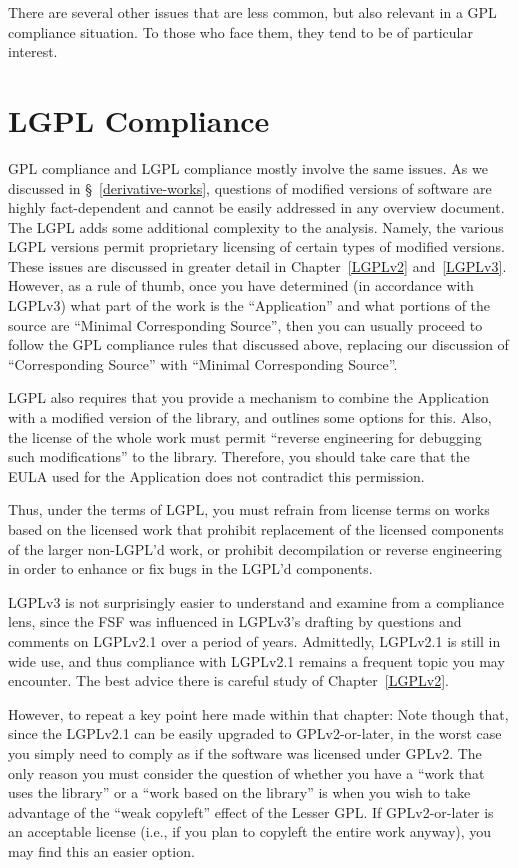 There are several other issues that are less common, but also relevant in
a GPL compliance situation.  To those who face them, they tend to be of
particular interest.

\section{LGPL Compliance}
\label{lgpl}

GPL compliance and LGPL compliance mostly involve the same issues.  As we
discussed in \S~\ref{derivative-works}, questions of modified versions of
software are highly fact-dependent and cannot be easily addressed in any
overview document.  The LGPL adds some additional complexity to the
analysis.  Namely, the various LGPL versions permit proprietary licensing
of certain types of modified versions.  These issues are discussed in greater
detail in Chapter~\ref{LGPLv2} and~\ref{LGPLv3}.  However, as a rule of thumb, once you have determined
(in accordance with LGPLv3) what part of the work is the ``Application''
and what portions of the source are ``Minimal Corresponding Source'', then
you can usually proceed to follow the GPL compliance rules that
discussed above, replacing our discussion of ``Corresponding Source'' with
``Minimal Corresponding Source''.

LGPL also requires that you provide a mechanism to combine the Application
with a modified version of the library, and outlines some options for
this.  Also, the license of the whole work must permit ``reverse
engineering for debugging such modifications'' to the library.  Therefore,
you should take care that the EULA used for the Application does not
contradict this permission.

Thus, under the terms of LGPL, you must refrain from license terms on works
based on the licensed work that prohibit replacement of the licensed
components of the larger non-LGPL'd work, or prohibit decompilation or
reverse engineering in order to enhance or fix bugs in the LGPL'd components.

LGPLv3 is not surprisingly easier to understand and examine from a compliance
lens, since the FSF was influenced in LGPLv3's drafting by questions and
comments on LGPLv2.1 over a period of years.  Admittedly, LGPLv2.1 is still
in wide use, and thus compliance with LGPLv2.1 remains a frequent topic you
may encounter.  The best advice there is careful study of
Chapter~\ref{LGPLv2}.

However, to repeat a key point here made within that chapter: Note though
that, since the LGPLv2.1 can be easily upgraded to GPLv2-or-later, in the
worst case you simply need to comply as if the software was licensed under
GPLv2.  The only reason you must consider the question of whether you have a
``work that uses the library'' or a ``work based on the library'' is when you
wish to take advantage of the ``weak copyleft'' effect of the Lesser GPL\@.
If GPLv2-or-later is an acceptable license (i.e., if you plan to copyleft the
entire work anyway), you may find this an easier option.

